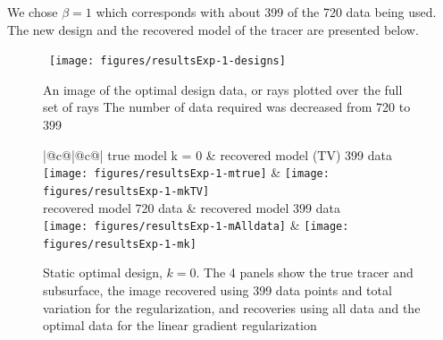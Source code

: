 \documentclass[12pt]{article}
\begin{document}
We chose $\beta =1$ which corresponds with about 399 of the 720 data being used. The new design and the recovered model of the tracer are presented below.
\begin{figure}[h!]
\begin{center}
\	\texttt{[image: figures/resultsExp-1-designs]}
\end{center}
\caption{An image of the optimal design data, or rays plotted over the full set of rays The number of data required was decreased from 720 to 399}
\end{figure}
\begin{figure}[!h]
	\renewcommand{\arraystretch}{1.5}
	\begin{center}
		\iwidth=100mm
		\begin{tabular}{{|@{}c@{}|@{}c@{}|}} %
			\hline		
			true model k = 0
			&
			recovered model (TV) 399 data	
			\\
			\hline		
			\texttt{[image: figures/resultsExp-1-mtrue]}
			&
			\texttt{[image: figures/resultsExp-1-mkTV]}
			\\
			\hline
			recovered model 720 data 
			&
			recovered model 399 data	
			\\
			\hline		
			\texttt{[image: figures/resultsExp-1-mAlldata]}
			&
			\texttt{[image: figures/resultsExp-1-mk]}
			\\
			\hline
		\end{tabular}
	\end{center}
	\caption{Static optimal design, $k=0$. The 4 panels show the true tracer and subsurface, the image recovered using 399 data points and total variation for the regularization, and recoveries using all data and the optimal data for the linear gradient regularization}
	\label{fig:results1}
\end{figure}
\end{document}
